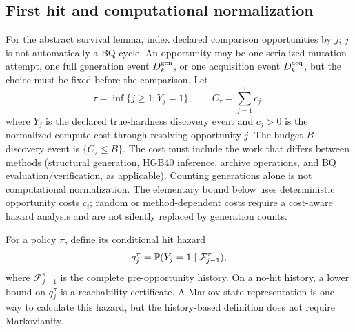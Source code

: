 \subsection{First hit and computational normalization}
For the abstract survival lemma, index declared comparison opportunities by
$j$; $j$ is not automatically a BQ cycle. An opportunity may be one serialized
mutation attempt, one full generation event $D_k^{\rm gen}$, or one
acquisition event $D_k^{\rm acq}$, but the choice must be fixed before the
comparison. Let
\[
 \tau=\inf\{j\geq 1:Y_j=1\},\qquad
 C_\tau=\sum_{j=1}^{\tau}c_j,
\]
where $Y_j$ is the declared true-hardness discovery event and $c_j>0$ is the
normalized compute cost through resolving opportunity $j$.
The budget-$B$ discovery event is $\{C_\tau\leq B\}$. The cost must include
the work that differs between methods (structural generation, HGB40 inference,
archive operations, and BQ evaluation/verification, as applicable). Counting
generations alone is not computational normalization. The elementary bound
below uses deterministic opportunity costs $c_i$; random or method-dependent
costs require a cost-aware hazard analysis and are not silently replaced by
generation counts.

For a policy $\pi$, define its conditional hit hazard
\[
 q_j^\pi=\mathbb{P}(Y_j=1\mid\mathcal{F}_{j-1}^\pi),
\]
where $\mathcal{F}_{j-1}^\pi$ is the complete pre-opportunity history. On a
no-hit history, a lower bound on $q_j^\pi$ is a reachability certificate. A
Markov state representation is one way to calculate this hazard, but the
history-based definition does not require Markovianity.

